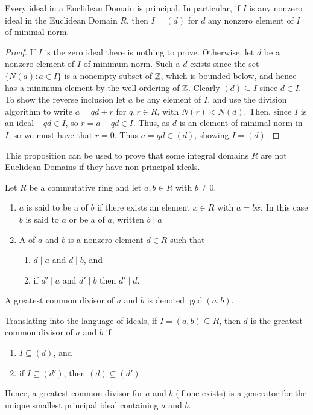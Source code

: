 \begin{prop}
    Every ideal in a Euclidean Domain is principal. In particular, if $I$ is any nonzero ideal in the Euclidean Domain $R$, then $I = (d)$ for $d$ any nonzero element of $I$ of minimal norm.
\end{prop}
\begin{proof}
    If $I$ is the zero ideal there is nothing to prove. Otherwise, let $d$ be a nonzero element of $I$ of minimum norm. Such a $d$ exists since the set $\{N(a):a \in I\}$ is a nonempty subset of $\mathbb Z$, which is bounded below, and hence has a minimum element by the well-ordering of $\mathbb Z$. Clearly $(d) \subseteq I$ since $d \in I$. To show the reverse inclusion let $a$ be any element of $I$, and use the division algorithm to write $a = qd + r$ for $q,r \in R$, with $N(r) < N(d)$. Then, since $I$ is an ideal $-qd \in I$, so $r = a-qd \in I$. Thus, as $d$ is an element of minimal norm in $I$, so we must have that $r = 0$. Thus $a = qd \in (d)$, showing $I = (d)$.
\end{proof}

\begin{rmk}
    This proposition can be used to prove that some integral domains $R$ are not Euclidean Domains if they have non-principal ideals.
\end{rmk}

\begin{defn}
    Let $R$ be a commutative ring and let $a,b \in R$ with $b \neq 0$. \begin{enumerate}
        \item $a$ is said to be a  of $b$ if there exists an element $x \in R$ with $a = bx$. In this case $b$ is said to  $a$ or be a  of $a$, written $b\;\vert\;a$
        \item A  of $a$ and $b$ is a nonzero element $d \in R$ such that \begin{enumerate}
                \item $d\;\vert\;a$ and $d\;\vert\;b$, and 
                \item if $d'\;\vert\;a$ and $d'\;\vert\;b$ then $d'\;\vert\;d$.
        \end{enumerate}
    \end{enumerate}
    A greatest common divisor of $a$ and $b$ is denoted $\gcd(a,b)$.
\end{defn}


\begin{rmk}
    Translating into the language of ideals, if $I = (a,b) \subseteq R$, then $d$ is the greatest common divisor of $a$ and $b$ if \begin{enumerate}
        \item $I \subseteq (d)$, and
        \item if $I \subseteq (d')$, then $(d) \subseteq (d')$
    \end{enumerate}
    Hence, a greatest common divisor for $a$ and $b$ (if one exists) is a generator for the unique smallest principal ideal containing $a$ and $b$.
\end{rmk}


